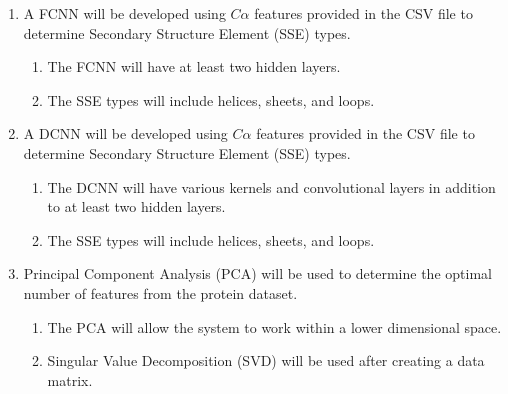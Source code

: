 \documentclass[12pt,letterpaper,oneside,reqno]{book}
\theoremstyle{plain}
\theoremstyle{definition}
\theoremstyle{plain}
\theoremstyle{remark}
\theoremstyle{plain}
\theoremstyle{definition}
\theoremstyle{plain}
\begin{document}
\begin{enumerate}
    \item A FCNN will be developed using $C\alpha$ features provided in the CSV file to determine Secondary Structure Element (SSE) types.
    \begin{enumerate}
        \item The FCNN will have at least two hidden layers.
        \item The SSE types will include helices, sheets, and loops.
    \end{enumerate}
    
    \item A DCNN will be developed using $C\alpha$ features provided in the CSV file to determine Secondary Structure Element (SSE) types.
    \begin{enumerate}
        \item The DCNN will have various kernels and convolutional layers in addition to at least two hidden layers.
        \item The SSE types will include helices, sheets, and loops.
    \end{enumerate}
    
    \item Principal Component Analysis (PCA) will be used to determine the optimal number of features from the protein dataset.
    \begin{enumerate}
        \item The PCA will allow the system to work within a lower dimensional space.
        \item Singular Value Decomposition (SVD) will be used after creating a data matrix.
    \end{enumerate}
    
\end{enumerate}
\end{document}
